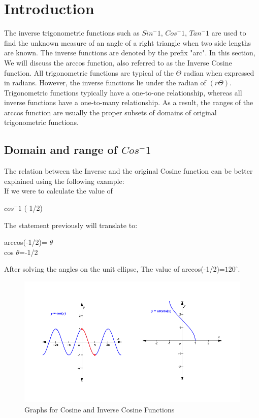 \documentclass{article}
\begin{document}
    \section{Introduction}
    The inverse trigonometric functions such as $Sin^-1$, $Cos^-1$, $Tan^-1$ are used to find the unknown measure of an angle of a right triangle when two side lengths are known. The inverse functions are denoted by the prefix "arc". In this section, We will discuss the arccos function, also referred to as the Inverse Cosine function. All trigonometric functions are typical of the $\Theta$  radian when expressed in radians. However, the inverse functions lie under the radian of $(r\Theta)$. Trigonometric functions typically have a one-to-one relationship, whereas all inverse functions have a one-to-many relationship. As a result, the ranges of the arccos function are usually the proper subsets of domains of original trigonometric functions.
        {\subsection{Domain and range of $Cos^-1$}}
    \justify
    The relation between the Inverse and the original Cosine function can be better explained using the following example:
    \\     If we were to calculate the value of\begin{center}
                                                   $cos^-1$ (-1/2)
    \end{center}
    The statement previously will translate to:
    \begin{center}
        arccos(-1/2)= $\theta$\\
        cos $\theta$=-1/2\\
    \end{center}
    After solving the angles on the unit ellipse, The value of arccos(-1/2)=$120^\circ$.
    \begin{figure}[hbt!]
        \centering
        \includegraphics[width=1.2\textwidth]{Images/relation.png}
        \caption{Graphs for Cosine and Inverse Cosine Functions }
        \label{fig:Speed vs. Torque from Pittman}
    \end{figure}
\end{document}
